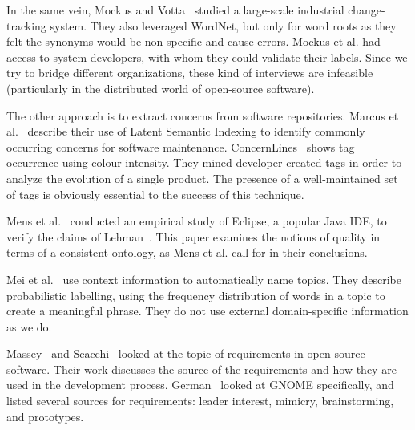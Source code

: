 \documentclass[]{sig-alternate}
\begin{document}
In the same vein, Mockus and Votta~\cite{Mockus00} studied a large-scale industrial change-tracking system. 
They also leveraged WordNet, but only for word roots as they felt the synonyms would be non-specific and cause errors. 
Mockus et al. had access to system developers, with whom they could validate their labels. 
Since we try to bridge different organizations, these kind of interviews are infeasible (particularly in the distributed world of open-source software).

The other approach is to extract concerns from software repositories.
Marcus et al.~\cite{marcus04wcre} describe their use of Latent Semantic Indexing to identify commonly occurring concerns for software maintenance. 
ConcernLines~\cite{treude09cl} shows tag occurrence using colour intensity. 
They mined 
developer created tags 
in order to analyze the evolution of a single product.
The presence of a well-maintained set of tags is obviously essential to the success of this technique.

Mens et al.~\cite{mens08icsm} conducted an empirical study of Eclipse, a popular Java IDE, to verify the claims of Lehman~\cite{lehman97sms}.
This paper examines the notions of quality in terms of a consistent ontology, as Mens
et al. call for in their conclusions.

Mei et al.~\cite{Mei2007} use context information to automatically name topics. 
They describe probabilistic labelling, using the frequency distribution of words in a topic to create a meaningful phrase. 
They do not use external domain-specific information as we do.

Massey~\cite{massey02icse} and Scacchi~\cite{scacchi05b} looked at the topic of requirements in open-source software. 
Their work discusses the source of the requirements and how they are used in the development process. German~\cite{german03gnome} looked at GNOME specifically, and listed several sources for requirements: leader interest, mimicry, brainstorming, and prototypes. 
\end{document}
